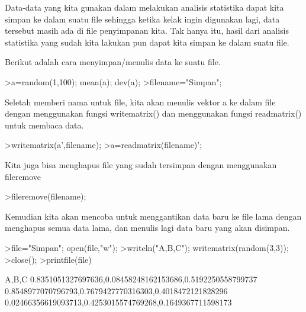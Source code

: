 \documentclass[a4paper,10pt]{article}
\begin{document}
\begin{eulernotebook}
\begin{eulercomment}
\begin{eulercomment}
\begin{eulercomment}
\begin{eulercomment}
\begin{eulercomment}
\begin{eulercomment}
\begin{eulercomment}
\begin{eulercomment}
\begin{eulercomment}
\begin{eulercomment}
\begin{eulercomment}
\begin{eulercomment}
\begin{eulercomment}
\begin{eulercomment}
\begin{eulercomment}
\begin{eulercomment}
\begin{eulercomment}
\begin{eulercomment}
\begin{eulercomment}
\begin{eulercomment}
\begin{eulercomment}
\begin{eulercomment}
\begin{eulercomment}
Data-data yang kita gunakan dalam melakukan analisis statistika dapat
kita simpan ke dalam suatu file sehingga ketika kelak ingin digunakan
lagi, data tersebut masih ada di file penyimpanan kita. Tak hanya itu,
hasil dari analisis statistika yang sudah kita lakukan pun dapat kita
simpan ke dalam suatu file.

Berikut adalah cara menyimpan/menulis data ke suatu file.
\end{eulercomment}
\begin{eulerprompt}
>a=random(1,100); mean(a); dev(a);
>filename="Simpan";
\end{eulerprompt}
\begin{eulercomment}
Seletah memberi nama untuk file, kita akan menulis vektor a ke dalam
file dengan menggunakan fungsi writematrix() dan menggunakan fungsi
readmatrix() untuk membaca data.
\end{eulercomment}
\begin{eulerprompt}
>writematrix(a',filename);
>a=readmatrix(filename)';
\end{eulerprompt}
\begin{eulercomment}
Kita juga bisa menghapus file yang sudah tersimpan dengan menggunakan
fileremove
\end{eulercomment}
\begin{eulerprompt}
>fileremove(filename);
\end{eulerprompt}
\begin{eulercomment}
Kemudian kita akan mencoba untuk menggantikan data baru ke file lama
dengan menghapus semua data lama, dan menulis lagi data baru yang akan
disimpan.
\end{eulercomment}
\begin{eulerprompt}
>file="Simpan"; open(file,"w");
>writeln("A,B,C"); writematrix(random(3,3));
>close();
>printfile(file)
\end{eulerprompt}
\begin{euleroutput}
  A,B,C
  0.8351051327697636,0.08458248162153686,0.5192250558799737
  0.8548977070796793,0.7679427770316303,0.4018472121828296
  0.02466356619093713,0.4253015574769268,0.1649367711598173
  

\end{euleroutput}
\end{eulercomment}
\end{eulercomment}
\end{eulercomment}
\end{eulercomment}
\end{eulercomment}
\end{eulercomment}
\end{eulercomment}
\end{eulercomment}
\end{eulercomment}
\end{eulercomment}
\end{eulercomment}
\end{eulercomment}
\end{eulercomment}
\end{eulercomment}
\end{eulercomment}
\end{eulercomment}
\end{eulercomment}
\end{eulercomment}
\end{eulercomment}
\end{eulercomment}
\end{eulercomment}
\end{eulercomment}
\end{eulernotebook}
\end{document}
